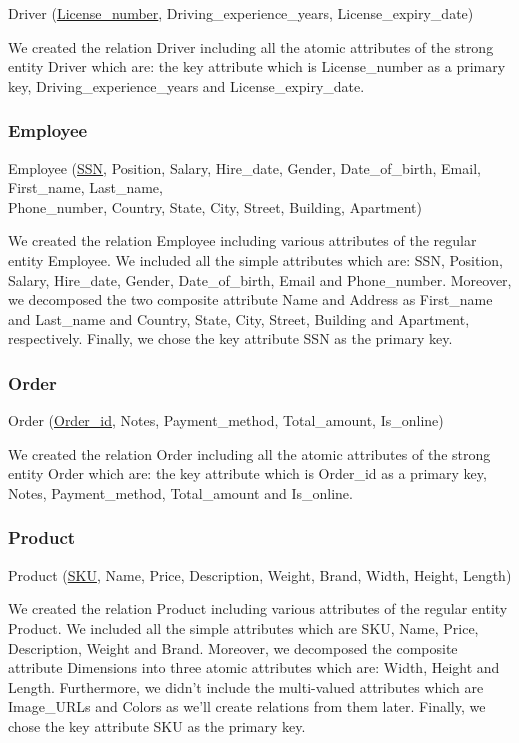 \documentclass[11pt]{article}
\begin{document}
Driver (\underline{License\_number}, Driving\_experience\_years, License\_expiry\_date)

We created the relation Driver including all the atomic attributes of the strong entity Driver which are: the key attribute which is License\_number as a primary key, Driving\_experience\_years and License\_expiry\_date.

\subsubsection{Employee}

Employee (\underline{SSN}, Position, Salary, Hire\_date, Gender, Date\_of\_birth, Email, First\_name, Last\_name, \\
Phone\_number, Country, State, City, Street, Building, Apartment)

We created the relation Employee including various attributes of the regular entity Employee. We included all the simple attributes which are: SSN, Position, Salary, Hire\_date, Gender, Date\_of\_birth, Email and Phone\_number. Moreover, we decomposed the two composite attribute Name and Address as First\_name and Last\_name and Country, State, City, Street, Building and Apartment, respectively. Finally, we chose the key attribute SSN as the primary key.

\subsubsection{Order}

Order (\underline{Order\_id}, Notes, Payment\_method, Total\_amount, Is\_online)

We created the relation Order including all the atomic attributes of the strong entity Order which are: the key attribute which is Order\_id as a primary key, Notes, Payment\_method, Total\_amount and Is\_online.

\subsubsection{Product}

Product (\underline{SKU}, Name, Price, Description, Weight, Brand, Width, Height, Length)

We created the relation Product including various attributes of the regular entity Product. We included all the simple attributes which are SKU, Name, Price, Description, Weight and Brand. Moreover, we decomposed the composite attribute Dimensions into three atomic attributes which are: Width, Height and Length. Furthermore, we didn't include the multi-valued attributes which are Image\_URLs and Colors as we'll create relations from them later. Finally, we chose the key attribute SKU as the primary key.
\end{document}
